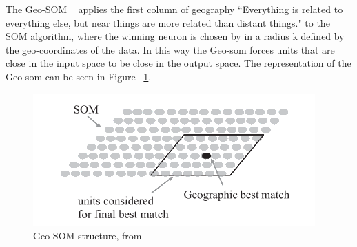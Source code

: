 

The Geo-SOM ~\citet{Bacao2005} applies the first column of geography “Everything is related to everything else, but near things are more related than distant things." to the SOM algorithm, where the winning neuron is chosen by in a radius k defined by the geo-coordinates of the data. In this way the Geo-som forces units that are close in the input space to be close in the output space. The representation of the Geo-som can be seen in Figure ~\ref{fig:geo_som}.



\begin{figure}[tb]
  \begin{center}
    \includegraphics[]{images/6_geo-som.png}
  \end{center}
  \caption{Geo-SOM structure, from ~\citet{Bacao2005}}
  \label{fig:geo_som}
\end{figure}

